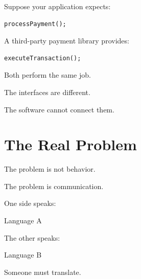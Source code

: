 \documentclass[11pt,a4paper]{book}
\begin{document}
Suppose your application expects:

\begin{verbatim}
processPayment();
\end{verbatim}


A third-party payment library
provides:

\begin{verbatim}
executeTransaction();
\end{verbatim}


Both perform the same job.


The interfaces are different.


The software cannot connect them.


\section{The Real Problem}

The problem is not behavior.


The problem is communication.


One side speaks:


Language A


The other speaks:


Language B


Someone must translate.

\end{document}
